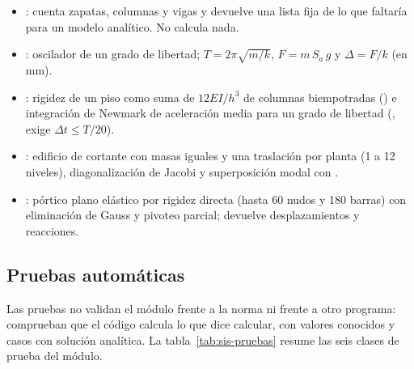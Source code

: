 \begin{itemize}
	\item {}: cuenta zapatas, columnas y vigas y devuelve una lista fija de lo que
	      faltaría para un modelo analítico. No calcula nada.
	\item {}: oscilador de un grado de libertad; $T = 2\pi\sqrt{m/k}$,
	      $F = m\,S_a\,g$ y $\Delta = F/k$ (en mm).
	\item {}: rigidez de un piso como suma de $12EI/h^3$ de columnas biempotradas
	      () e integración de Newmark de aceleración media para un grado de libertad
	      (, exige $\Delta t \le T/20$).
	\item {}: edificio de cortante con masas iguales y una traslación por planta
	      (1 a 12 niveles), diagonalización de Jacobi y superposición modal con .
	\item {}: pórtico plano elástico por rigidez directa (hasta 60 nudos y 180
	      barras) con eliminación de Gauss y pivoteo parcial; devuelve desplazamientos y reacciones.
\end{itemize}

\subsection{Pruebas automáticas}
\label{sec:sis-pruebas}

Las pruebas no validan el módulo frente a la norma ni frente a otro programa: comprueban que el código calcula lo que
dice calcular, con valores conocidos y casos con solución analítica. La tabla~\ref{tab:sis-pruebas} resume las seis
clases de prueba del módulo.

